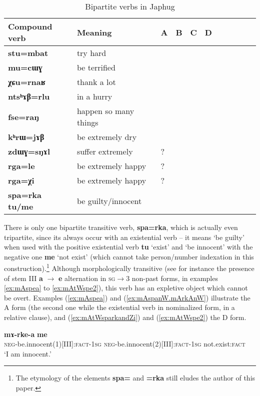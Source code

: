 \documentclass[11pt]{article}
\newcommand{\ipa}[1]{{\phon\textbf{#1}}}
\newcommand{\Y}{\Checkmark}
\newcommand{\jpg}[2]{\ipa{#1} `#2'}
\newcommand{\refb}[1]{(\ref{#1})}
\begin{document}
\begin{table}[h]
\caption{Bipartite verbs in Japhug} \label{tab:bipartite} \centering
\begin{tabular}{lllllllllll}
\toprule
Compound verb& Meaning	 & 	A & 	B & 	C & 	D & \\
\midrule
\ipa{stu=mbat} & 	try hard & 	\Y & 	\Y & 	\Y & 	\Y & 	\\	
\ipa{mu=cɯɣ} & 	be  terrified  & 	\Y & 	 & 	 & 	 & 	\\	
\ipa{χɕu=rnaʁ} & 	thank a lot & 	\Y & 	\Y & 	 & 	 & 	\\	
\ipa{ntsʰɤβ=rlu} & 	in a hurry & 	 & 	\Y & 	 & 	\Y & 	\\	
\ipa{fse=raŋ} & 	happen so many things & 	\Y & 	 & 	 & 	 & 	\\	
\ipa{kʰrɯ=jɤβ} & 	be extremely dry & 	\Y & 	 & 	 & 	\Y & 	\\	
\ipa{zdɯɣ=sŋɤl} & 	suffer extremely & 	\Y? & 	 & 	 & 	\Y & 	\\	
\ipa{rga=le} & 	be extremely happy & 	\Y? & 	\Y & 	 & 	 & 	\\	
\ipa{rga=χi} & 	be extremely happy & 	\Y? & 	\Y & 	 & 	 & 	\\	
\midrule
\ipa{spa=rka tu/me} & 	be guilty/innocent & 	\Y & 	 & 	 & 	\Y & 	\\	
\bottomrule
\end{tabular}
\end{table}

There is only one bipartite transitive verb, \ipa{spa=rka}, which is actually even tripartite, since its always occur with an existential verb -- it means `be guilty' when used with the positive existential verb \jpg{tu}{exist} and  `be innocent' with the negative one \jpg{me}{not exist} (which cannot take person/number indexation in this construction).\footnote{The etymology of the elements \ipa{spa=} and \ipa{=rka} still eludes the author of this paper.} Although morphologically transitive (see for instance the presence of stem III \ipa{a} $\rightarrow$ \ipa{e} alternation in \textsc{sg}$\rightarrow$3 non-past forms, in examples \ref{ex:mAspea} to \ref{ex:mAtWspe2}), this verb has an expletive object which cannot be overt. Examples \refb{ex:mAspea}  and \refb{ex:mAspanW.mArkAnW} illustrate the A form (the second one while the existential verb in nominalized form, in a relative clause), and \refb{ex:mAtWsparkandZi} and \refb{ex:mAtWspe2} the D form. 

\begin{exe}
\ex \label{ex:mAspea}
\gll \ipa{mɤ-spe-a} \ipa{mɤ-rke-a} \ipa{me} \\
\textsc{neg}-be.innocent(1)[III]:\textsc{fact}-\textsc{1sg} \textsc{neg}-be.innocent(2)[III]:\textsc{fact}-\textsc{1sg} not.exist:\textsc{fact} \\
\glt `I am innocent.'
\end{exe} 
\end{document}
